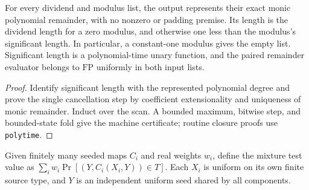 \begin{theorem}
  \label{thm:lowerbounds-algebraic-bit-remainder}
  \leanok
  For every dividend and modulus list, the output represents their
  exact monic polynomial remainder, with no nonzero or padding premise.
  Its length is the dividend length for a zero modulus, and otherwise
  one less than the modulus's significant length. In particular, a
  constant-one modulus gives the empty list. Significant length is a
  polynomial-time unary function, and the paired remainder evaluator
  belongs to $\mathrm{FP}$ uniformly in both input lists.
\end{theorem}
\begin{proof}
  \leanok
  Identify significant length with the represented polynomial degree
  and prove the single cancellation step by coefficient extensionality
  and uniqueness of monic remainder. Induct over the scan. A bounded
  maximum, bitwise step, and bounded-state fold give the machine
  certificate; routine closure proofs use \texttt{polytime}.
\end{proof}

\begin{definition}
  \label{def:lowerbounds-algebraic-seeded-mixture}
  \leanok
  Given finitely many seeded maps $C_i$ and real weights $w_i$, define
  the mixture test value as $\sum_i w_i\Pr[(Y,C_i(X_i,Y))\in T]$.
  Each $X_i$ is uniform on its own finite source type, and $Y$ is
  an independent uniform seed shared by all components.
\end{definition}

